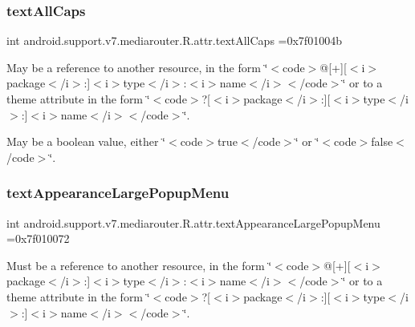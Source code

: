 \subsubsection{\texorpdfstring{text\+All\+Caps}{textAllCaps}}
{\footnotesize\ttfamily int android.\+support.\+v7.\+mediarouter.\+R.\+attr.\+text\+All\+Caps =0x7f01004b\hspace{0.3cm}{\ttfamily [static]}}

May be a reference to another resource, in the form \char`\"{}$<$code$>$@\mbox{[}+\mbox{]}\mbox{[}$<$i$>$package$<$/i$>$\+:\mbox{]}$<$i$>$type$<$/i$>$\+:$<$i$>$name$<$/i$>$$<$/code$>$\char`\"{} or to a theme attribute in the form \char`\"{}$<$code$>$?\mbox{[}$<$i$>$package$<$/i$>$\+:\mbox{]}\mbox{[}$<$i$>$type$<$/i$>$\+:\mbox{]}$<$i$>$name$<$/i$>$$<$/code$>$\char`\"{}. 

May be a boolean value, either \char`\"{}$<$code$>$true$<$/code$>$\char`\"{} or \char`\"{}$<$code$>$false$<$/code$>$\char`\"{}. \mbox{\label{classandroid_1_1support_1_1v7_1_1mediarouter_1_1R_1_1attr_aee9155740aa9815abf21bed7daf09131}} 
\subsubsection{\texorpdfstring{text\+Appearance\+Large\+Popup\+Menu}{textAppearanceLargePopupMenu}}
{\footnotesize\ttfamily int android.\+support.\+v7.\+mediarouter.\+R.\+attr.\+text\+Appearance\+Large\+Popup\+Menu =0x7f010072\hspace{0.3cm}{\ttfamily [static]}}

Must be a reference to another resource, in the form \char`\"{}$<$code$>$@\mbox{[}+\mbox{]}\mbox{[}$<$i$>$package$<$/i$>$\+:\mbox{]}$<$i$>$type$<$/i$>$\+:$<$i$>$name$<$/i$>$$<$/code$>$\char`\"{} or to a theme attribute in the form \char`\"{}$<$code$>$?\mbox{[}$<$i$>$package$<$/i$>$\+:\mbox{]}\mbox{[}$<$i$>$type$<$/i$>$\+:\mbox{]}$<$i$>$name$<$/i$>$$<$/code$>$\char`\"{}. \mbox{\label{classandroid_1_1support_1_1v7_1_1mediarouter_1_1R_1_1attr_a4baedae190dea72517bc95b649f9703f}} 
